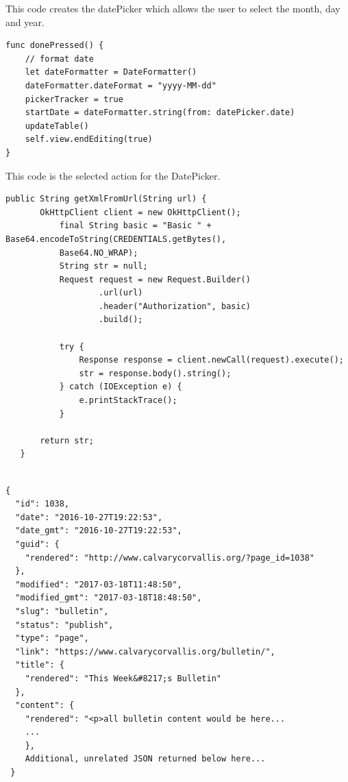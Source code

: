 \documentclass[letterpaper,10pt,draftclsnofoot,onecolumn,titlepage]{IEEEtran}
\begin{document}
This code creates the datePicker which allows the user to select the month, day and year.

\begin{lstlisting}[caption=iOS EventViewController Snippet]
func donePressed() {
    // format date
    let dateFormatter = DateFormatter()
    dateFormatter.dateFormat = "yyyy-MM-dd"
    pickerTracker = true
    startDate = dateFormatter.string(from: datePicker.date)
    updateTable()
    self.view.endEditing(true)
}
\end{lstlisting}

This code is the selected action for the DatePicker.

\begin{lstlisting}[caption=Android XML Parser]
 public String getXmlFromUrl(String url) {
       OkHttpClient client = new OkHttpClient();
           final String basic = "Basic " + Base64.encodeToString(CREDENTIALS.getBytes(),
           Base64.NO_WRAP);
           String str = null;
           Request request = new Request.Builder()
                   .url(url)
                   .header("Authorization", basic)
                   .build();

           try {
               Response response = client.newCall(request).execute();
               str = response.body().string();
           } catch (IOException e) {
               e.printStackTrace();
           }

       return str;
   }
\end{lstlisting}

\begin{lstlisting}[caption=iOS JSON Response]

{
  "id": 1038,
  "date": "2016-10-27T19:22:53",
  "date_gmt": "2016-10-27T19:22:53",
  "guid": {
    "rendered": "http://www.calvarycorvallis.org/?page_id=1038"
  },
  "modified": "2017-03-18T11:48:50",
  "modified_gmt": "2017-03-18T18:48:50",
  "slug": "bulletin",
  "status": "publish",
  "type": "page",
  "link": "https://www.calvarycorvallis.org/bulletin/",
  "title": {
    "rendered": "This Week&#8217;s Bulletin"
  },
  "content": {
    "rendered": "<p>all bulletin content would be here...
    ...
    },
    Additional, unrelated JSON returned below here...
 }

\end{lstlisting}
		
\end{document}
